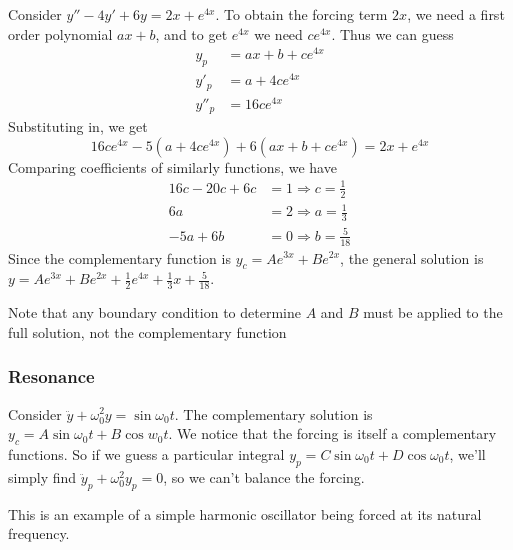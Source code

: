 \documentclass[a4paper]{article}
\begin{document}
\begin{eg}
  Consider $y'' - 4y' + 6y = 2x + e^{4x}$. To obtain the forcing term $2x$, we need a first order polynomial $ax + b$, and to get $e^{4x}$ we need $ce^{4x}$. Thus we can guess
  \begin{align*}
    y_p &= ax + b + ce^{4x}\\
    y'_p &= a + 4ce^{4x}\\
    y''_p &= 16ce^{4x}
  \end{align*}
  Substituting in, we get
  \[
    16ce^{4x} - 5(a + 4ce^{4x}) + 6(ax + b + ce^{4x}) = 2x + e^{4x}
  \]
  Comparing coefficients of similarly functions, we have
  \begin{align*}
    16c - 20c + 6c &= 1\Rightarrow c = \frac{1}{2}\\
    6a &= 2 \Rightarrow a = \frac{1}{3}\\
    -5a + 6b &= 0 \Rightarrow b = \frac{5}{18}
  \end{align*}
  Since the complementary function is $y_c = Ae^{3x} + Be^{2x}$, the general solution is $y = Ae^{3x} + Be^{2x} + \frac{1}{2}e^{4x} + \frac{1}{3}x + \frac{5}{18}$.

  Note that any boundary condition to determine $A$ and $B$ must be applied to the full solution, not the complementary function
\end{eg}
\subsubsection{Resonance}
Consider $\ddot y + \omega_0^2 y = \sin \omega_0 t$. The complementary solution is $y_c = A\sin \omega_0 t + B\cos w_0 t$. We notice that the forcing is itself a complementary functions. So if we guess a particular integral $y_p = C\sin \omega_0 t + D\cos \omega_0 t$, we'll simply find $\ddot y_p + \omega_0 ^2 y_p = 0$, so we can't balance the forcing.

This is an example of a simple harmonic oscillator being forced at its natural frequency.
\end{document}
